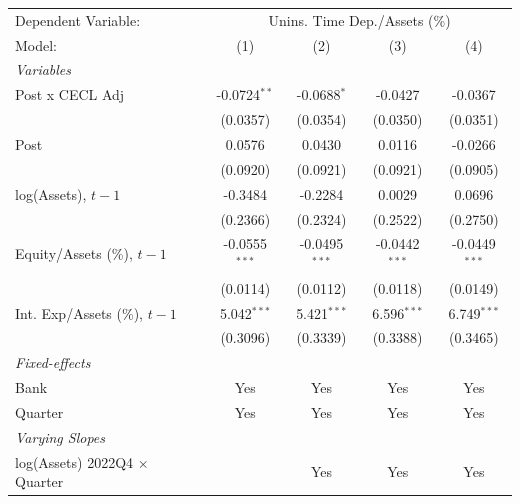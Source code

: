 
\begingroup
\centering
\begin{tabular}{lcccc}
   \tabularnewline \midrule \midrule
   Dependent Variable: & \multicolumn{4}{c}{Unins. Time Dep./Assets (\%)}\\
   Model:                                  & (1)             & (2)             & (3)             & (4)\\  
   \midrule
   \emph{Variables}\\
   Post x CECL Adj                         & -0.0724$^{**}$  & -0.0688$^{*}$   & -0.0427         & -0.0367\\   
                                           & (0.0357)        & (0.0354)        & (0.0350)        & (0.0351)\\   
   Post                                    & 0.0576          & 0.0430          & 0.0116          & -0.0266\\   
                                           & (0.0920)        & (0.0921)        & (0.0921)        & (0.0905)\\   
   log(Assets), $t{-}1$                    & -0.3484         & -0.2284         & 0.0029          & 0.0696\\   
                                           & (0.2366)        & (0.2324)        & (0.2522)        & (0.2750)\\   
   Equity/Assets (\%), $t{-}1$             & -0.0555$^{***}$ & -0.0495$^{***}$ & -0.0442$^{***}$ & -0.0449$^{***}$\\   
                                           & (0.0114)        & (0.0112)        & (0.0118)        & (0.0149)\\   
   Int. Exp/Assets (\%), $t{-}1$           & 5.042$^{***}$   & 5.421$^{***}$   & 6.596$^{***}$   & 6.749$^{***}$\\   
                                           & (0.3096)        & (0.3339)        & (0.3388)        & (0.3465)\\   
   \midrule
   \emph{Fixed-effects}\\
   Bank                                    & Yes             & Yes             & Yes             & Yes\\  
   Quarter                                 & Yes             & Yes             & Yes             & Yes\\  
   \midrule
   \emph{Varying Slopes}\\
   log(Assets) 2022Q4 $\times$ Quarter                 &                 & Yes             & Yes             & Yes\\  

\end{tabular}
